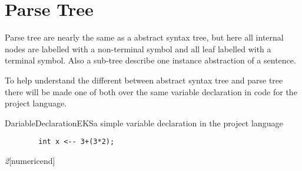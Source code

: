 


\section{Parse Tree}
Parse tree are nearly the same as a abstract syntax tree, but here all internal nodes are labelled with a non-terminal symbol and all leaf labelled with a terminal symbol. Also a sub-tree describe one instance abstraction of a sentence.

To help understand the different between abstract syntax tree and parse tree there will be made one of both over the same variable declaration in code for the project language.

\begin{code}{DariableDeclarationEKS}{a simple variable declaration in the project language}
	\begin{lstlisting}
		int x <-- 3+(3*2);
	\end{lstlisting}
\end{code}

\tree[.numeric [.plusminusorempty]\textit{2}[numericend]



